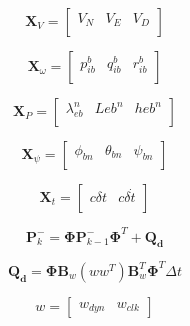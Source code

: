 \begin{equation}\label{eq:velVector}
    \mathbf{X}_V =
    \begin{bmatrix}
        V_N & V_E & V_D \\
    \end{bmatrix}
\end{equation}

\begin{equation}\label{eq:omegaVector}
    \mathbf{X}_{\omega} =
    \begin{bmatrix}
        p_{ib}^b & q_{ib}^b & r_{ib}^b \\
    \end{bmatrix}
\end{equation}

\begin{equation}\label{eq:posVector}
    \mathbf{X}_P =
    \begin{bmatrix}
        \lambda_{eb}^n & L{eb}^n & h{eb}^n \\
    \end{bmatrix}
\end{equation}

\begin{equation}\label{eq:eulVector}
    \mathbf{X}_{\psi} =
    \begin{bmatrix}
        \phi_{bn} & \theta_{bn} & \psi_{bn} \\
    \end{bmatrix}
\end{equation}

\begin{equation}\label{eq:clkVector}
    \mathbf{X}_t = \begin{bmatrix}
        c\delta t & c\delta\dot{t} \\
    \end{bmatrix}
\end{equation}

\begin{equation}\label{eq:pminus}
    \mathbf{P}^-_{k} = \mathbf{\Phi}\mathbf{P}^-_{k-1} \mathbf{\Phi}^T + \mathbf{Q_d}
\end{equation}

\begin{equation}\label{eq:Qd}
    \mathbf{Q_d} = \mathbf{\Phi}\mathbf{B}_w \left(ww^T\right) \mathbf{B}_w^T \mathbf{\Phi}^T \Delta t
\end{equation}

\begin{equation}\label{eq:w}
    w = \begin{bmatrix}
        w_{dyn} & w_{clk}
    \end{bmatrix}
\end{equation}

